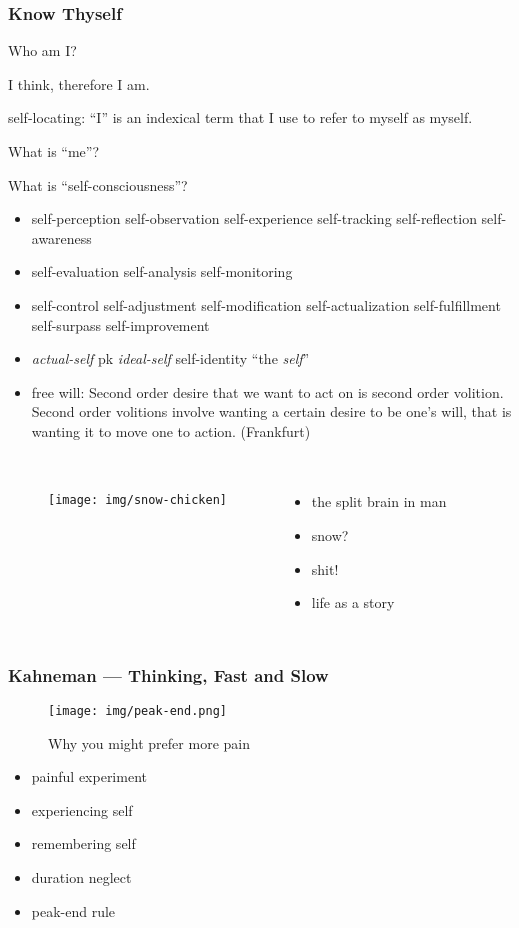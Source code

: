 \documentclass[UTF8,11pt,colorlinks,compress,openany]{beamer}%
\begin{document}
\begin{frame}\frametitle{Know Thyself}
\centerline{\Huge Who am I?}
\centerline{I think, therefore I am.}
\centerline{self-locating: ``I'' is an indexical term that I use to refer to myself as myself.}
\centerline{What is ``me''?}
\centerline{\Large What is ``self-consciousness''?}
\begin{itemize}
	\item self-perception self-observation self-experience self-tracking self-reflection self-awareness
	\item self-evaluation self-analysis self-monitoring
	\item self-control self-adjustment self-modification self-actualization self-fulfillment self-surpass self-improvement
	\item \emph{actual-self} pk \emph{ideal-self} self-identity ``the \emph{self}''
	\item free will: Second order desire that we want to act on is second order volition. Second order volitions involve wanting a certain desire to be one's will, that is wanting it to move one to action. (Frankfurt)
\end{itemize}
\end{frame}

\begin{frame}\frametitle{}
\begin{columns}
	\begin{figure}[H]
		\begin{center}
			\texttt{[image: img/snow-chicken]}
		\end{center}
	\end{figure}
\begin{itemize}
	\item the split brain in man
	\item snow?
	\item shit!
	\item life as a story
\end{itemize}
\end{columns}
\end{frame}

\begin{frame}\frametitle{Kahneman --- Thinking, Fast and Slow}
	\begin{figure}[H]
		\begin{center}
			\texttt{[image: img/peak-end.png]}\caption{Why you might prefer more pain}
		\end{center}
	\end{figure}
\begin{itemize}
	\item painful experiment
	\item experiencing self
	\item remembering self
	\item duration neglect
	\item peak-end rule
\end{itemize}
\end{frame}
\end{document}
